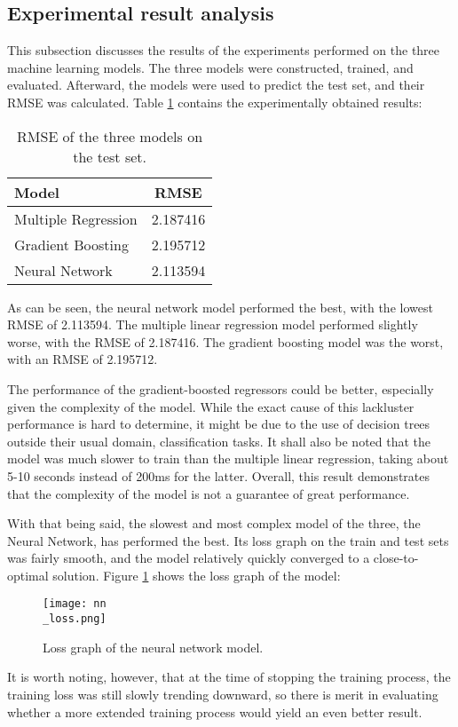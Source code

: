 \documentclass[12pt]{article}
\begin{document}
\subsection{Experimental result analysis}

This subsection discusses the results of the experiments performed on the three machine learning models. The three models were constructed, trained, and evaluated. Afterward, the models were used to predict the test set, and their RMSE was calculated. Table \ref{tab:results} contains the experimentally obtained results:

\begin{table}[h]
	\centering
	\begin{tabular}{lc}
		\toprule
		Model               & RMSE     \\
		\midrule
		Multiple Regression & 2.187416 \\
		Gradient Boosting   & 2.195712 \\
		Neural Network      & 2.113594 \\
		\bottomrule
	\end{tabular}
	\caption{RMSE of the three models on the test set.}
	\label{tab:results}
\end{table}

As can be seen, the neural network model performed the best, with the lowest RMSE of 2.113594. The multiple linear regression model performed slightly worse, with the RMSE of 2.187416. The gradient boosting model was the worst, with an RMSE of 2.195712.

The performance of the gradient-boosted regressors could be better, especially given the complexity of the model. While the exact cause of this lackluster performance is hard to determine, it might be due to the use of decision trees outside their usual domain, classification tasks. It shall also be noted that the model was much slower to train than the multiple linear regression, taking about 5-10 seconds instead of 200ms for the latter. Overall, this result demonstrates that the complexity of the model is not a guarantee of great performance.

With that being said, the slowest and most complex model of the three, the Neural Network, has performed the best. Its loss graph on the train and test sets was fairly smooth, and the model relatively quickly converged to a close-to-optimal solution. Figure \ref{fig:nn_loss} shows the loss graph of the model:

\begin{figure}[h]
	\centering
	\texttt{[image: nn\\\_loss.png]}
	\caption{Loss graph of the neural network model.}
	\label{fig:nn_loss}
\end{figure}
It is worth noting, however, that at the time of stopping the training process, the training loss was still slowly trending downward, so there is merit in evaluating whether a more extended training process would yield an even better result.
\end{document}
